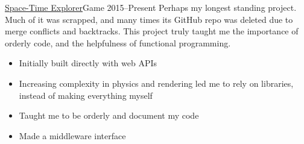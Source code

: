 \documentclass[10pt,a4paper,ragged2e,withhyper]{altacv}
\begin{document}
\begin{paracol}{2}
		\divider
		
		\cvevent
		{\href{https://github.com/jaacko-torus/STE/}{\uline{Space-Time Explorer}}{\hr}Game}
		{}
		{2015--Present}{}
		Perhaps my longest standing project. Much of it was scrapped, and many times its GitHub repo was deleted due to merge conflicts and backtracks. This project truly taught me the importance of orderly code, and the helpfulness of functional programming.
		\smallskip
		\begin{itemize}
			\item Initially built directly with web APIs
			\item Increasing complexity in physics and rendering led me to rely on libraries, instead of making everything myself
			\item Taught me to be orderly and document my code
			\item Made a middleware interface
		\end{itemize}
	\end{paracol}
\end{document}
